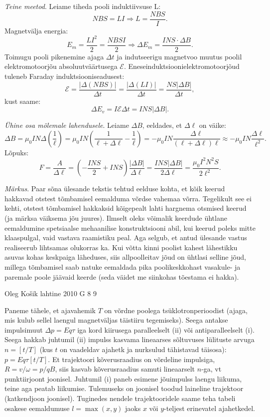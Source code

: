 \documentclass[11pt]{article}
\begin{document}
{{\emph{Teine meetod}. Leiame tiheda pooli induktiivsuse L:
\[
N B S=L I \Longrightarrow L=\frac{N B S}{I}.
\]
Magnetvälja energia:
\[
E_{m}=\frac{L I^{2}}{2}=\frac{N B S I}{2} \Longrightarrow \Delta E_{m}=\frac{I N S \cdot \Delta B}{2}.
\]
Toimugu pooli pikenemine ajaga $\Delta t$ ja indutseerigu magnetvoo muutus poolil elektromotoorjõu absoluutväärtusega $\mathcal{E}$. Eneseinduktsioonielektromotoorjõud tuleneb Faraday induktsiooniseadusest:
\[
\mathcal{E}=\frac{|\Delta(N B S)|}{\Delta t}=\frac{|\Delta(L I)|}{\Delta t}=\frac{N S|\Delta B|}{\Delta t},
\]
kust saame:
\[
\Delta E_{v}=I \mathcal{E} \Delta t=I N S|\Delta B|.
\]

\emph{Ühine osa mõlemale lahendusele}. Leiame $\Delta B$, eeldades, et $\Delta \ell$ on väike:
\[
\Delta B=\mu_{0} I N \Delta\left(\frac{1}{\ell}\right)=\mu_{0} I N\left(\frac{1}{\ell+\Delta \ell}-\frac{1}{\ell}\right)=-\mu_{0} I N \frac{\Delta \ell}{(\ell+\Delta \ell) \ell} \approx-\mu_{0} I N \frac{\Delta \ell}{\ell^{2}}.
\]
Lõpuks:
\[
F=\frac{A}{\Delta \ell}=\left(-\frac{I N S}{2}+I N S\right) \frac{|\Delta B|}{\Delta \ell}=\frac{I N S|\Delta B|}{2 \Delta \ell}=\frac{\mu_{0} I^{2} N^{2} S}{2 \ell^{2}}.
\]

\emph{Märkus}. Paar sõna ülesande tekstis tehtud eelduse kohta, et kõik keerud hakkavad otstest tõmbamisel eemalduma võrdse vahemaa võrra. Tegelikult see ei kehti, otstest tõmbamisel hakkaksid kõigepealt lahti hargnema otsmised keerud (ja märksa väiksema jõu juures). Ilmselt oleks võimalik keerdude ühtlane eemaldumine spetsiaalse mehaanilise konstruktsiooni abil, kui keerud poleks mitte klaaspulgal, vaid vastava raamistiku peal. Aga selgub, et antud ülesande vastus realiseerub lihtsamas olukorras ka. Kui võtta kinni poolist kahest lähestikku asuvas kohas keskpaiga läheduses, siis allpoolleitav jõud on ühtlasi selline jõud, millega tõmbamisel saab natuke eemaldada pika poolikeskkohast vasakule- ja paremale poole jäävaid keerde (seda väidet me siinkohas tõestama ei hakka). 
\fi
}

{Oleg Košik} %
{lahtine} %
{2010} %
{G 8} %
{9} %
{

\ifSolution
Paneme tähele, et ajavahemik $T$ on võrdne poolega tsüklotronperioodist (ajaga, mis kulub sellel laengul magnetväljas täistiiru tegemiseks).
Seega antakse impulsimuut $\Delta p=Eq\tau$ iga kord kiirusega paralleelselt (ii) 
või antiparalleelselt (i). Seega hakkab juhtumil (ii) impulss kasvama lineaarses sõltuvuses lülituste arvuga $n=[t/T]$ (kus $t$ on vaadeldav
ajahetk ja nurksulud tähistavad täisosa): $p=Eq\tau[t/T]$. Et trajektoori kõverusraadius on võrdeline impulsiga, $R=v/\omega=p/qB$, siis 
kasvab kõverusraadius samuti lineaarselt $n$-ga, vt punktiirjoont joonisel. 
Juhtumil (i) paneb esimene jõuimpulss laengu liikuma, teine aga peatab liikumise. Tulemuseks on joonisel toodud laineline trajektoor (katkendjoon joonisel).
Tuginedes nendele trajektooridele saame teha tabeli osakese eemaldumuse $l = \max (x,y)$ jaoks $x$ või $y$-teljest erinevatel ajahetkedel.

}}
\end{document}
